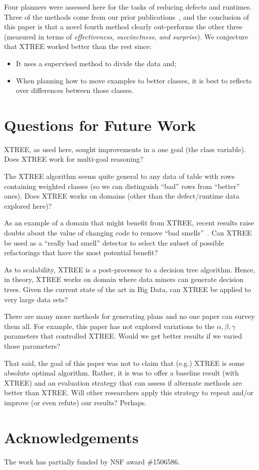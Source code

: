 \documentclass{sig-alternate}
\newcommand{\bi}{\begin{itemize}}
\newcommand{\ei}{\end{itemize}}
\begin{document}
Four planners were assessed here for the tasks of reducing defects and runtimes. 
Three of the methods come from our prior publications~\cite{me12c,krishna15}, and the conclusion of this
paper is that a novel fourth method clearly out-performs the other three
(measured in terms of {\em effectiveness, succinctness, and surprise}).
We conjecture that XTREE worked better than the rest since:
\bi
\item
It uses a supervised method to divide the data and;
\item
When planning how to move examples to better classes, it is   best to  reflects over 
differences between those classes.
\ei


\section{Questions for Future Work}

XTREE, as used here, sought improvements in a one goal (the   class variable). Does XTREE work for multi-goal reasoning?

 The XTREE algorithm seems quite general to any data of table with rows containing
weighted classes (so we can distinguish ``bad'' rows from ``better'' ones). 
Does   XTREE works  on   domains (other than the  defect/runtime data explored here)?

As an example of a domain that might benefit from XTREE, recent results raise doubts about
the value of changing code to remove ``bad smells''~\cite{Sjoberg13}. Can XTREE be used as a ``really bad smell''
detector to select the subset of possible refactorings that have the most   potential benefit?

As to scalability, XTREE is a post-processor to a decision tree algorithm. Hence, in theory,  XTREE   works on
  domain where data miners can generate decision trees. Given the current state of the art in Big Data,
can   XTREE  be applied to  very large data sets?

There are many more methods for generating plans and
no   one paper can survey them all. For example, this paper has not explored variations to the $\alpha,\beta,\gamma$
parameters that controlled XTREE. Would we get better results if we varied those parameters?

That said, the goal of this paper was not to claim that (e.g.) XTREE is some absolute optimal algorithm. Rather, it is
was to offer a baseline result (with XTREE) and an  evaluation strategy that  can assess  if alternate methods are better than XTREE.
Will other  researchers apply this strategy  to repeat and/or improve
(or even refute) our results?  Perhaps.

\section*{Acknowledgements}
The work has partially funded by NSF  award \#1506586.



\balance

\end{document}
